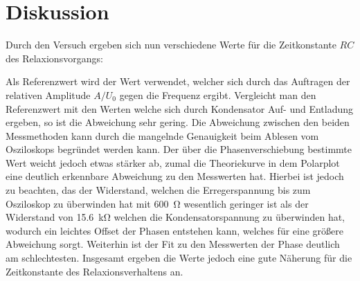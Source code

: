 \section{Diskussion}
\label{sec:Diskussion}
Durch den Versuch ergeben sich nun verschiedene Werte für die
Zeitkonstante $RC$ des Relaxionsvorgangs:

Als Referenzwert wird der Wert verwendet, welcher
sich durch das Auftragen der relativen Amplitude $A/U_0$ gegen die
Frequenz ergibt.
Vergleicht man den Referenzwert mit den Werten welche sich durch
Kondensator Auf- und Entladung ergeben, so ist die Abweichung sehr gering.
Die Abweichung zwischen den beiden Messmethoden kann durch die
mangelnde Genauigkeit beim Ablesen vom Osziloskops begründet werden kann.
Der über die Phasenverschiebung bestimmte Wert weicht jedoch etwas
stärker ab, zumal die Theoriekurve in dem Polarplot eine deutlich
erkennbare Abweichung zu den Messwerten hat.
Hierbei ist jedoch zu beachten, das der Widerstand, welchen die
Erregerspannung bis zum Osziloskop zu überwinden hat mit \SI{600}{\ohm}
wesentlich geringer ist als der Widerstand von \SI{15.6}{\kilo\ohm}
welchen die Kondensatorspannung zu überwinden hat, wodurch ein leichtes
Offset der Phasen entstehen kann, welches für eine größere Abweichung sorgt.
Weiterhin ist der Fit zu den Messwerten der Phase deutlich am schlechtesten.
Insgesamt ergeben die Werte jedoch eine gute Näherung für die Zeitkonstante
des Relaxionsverhaltens an.
